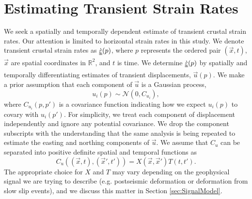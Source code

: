 \documentclass[extra,mreferee]{gji}
\newcommand*{\du}[1]{\uuline{#1}}
\begin{document}
\section{Estimating Transient Strain Rates}\label{sec:Method}
We seek a spatially and temporally dependent estimate of transient crustal strain rates. Our attention is limited to horizontal strain rates in this study. We denote transient crustal strain rates as $\dot{\du{\varepsilon}}(p)$, where $p$ represents the ordered pair $(\vec{x},t)$, $\vec{x}$ are spatial coordinates in $\mathbb{R}^2$, and $t$ is time. We determine $\dot{\du{\varepsilon}}(p)$ by spatially and temporally differentiating estimates of transient displacements, $\vec{u}(p)$. We make a prior assumption that each component of $\vec{u}$ is a Gaussian process,
\begin{equation}\label{eq:TransientDeformation}
u_i(p) \sim \mathcal{N}\left(0,C_{u_i}\right),
\end{equation}
where $C_{u_i}(p,p')$ is a covariance function indicating how we expect $u_i(p)$ to covary with $u_i(p')$. For simplicity, we treat each component of displacement independently and ignore any potential covariance. We drop the component subscripts with the understanding that the same analysis is being repeated to estimate the easting and northing components of $\vec{u}$. We assume that $C_u$ can be separated into positive definite spatial and temporal functions as 
\begin{equation}\label{eq:TransientCovariance}
C_{u}\left((\vec{x},t),(\vec{x}',t')\right) = X(\vec{x},\vec{x}')T(t,t').
\end{equation}  
The appropriate choice for $X$ and $T$ may vary depending on the geophysical signal we are trying to describe (e.g. postseismic deformation or deformation from slow slip events), and we discuss this matter in Section \ref{sec:SignalModel}.  
\end{document}
